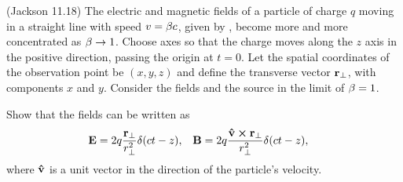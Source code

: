 \newcommand{\vr}{\vb{r}}
\newcommand{\vrperp}{\vr_\perp}

\begin{statement}{(Jackson 11.18)}
	The electric and magnetic fields of a particle of charge $q$ moving in a straight line with speed $v = \beta c$, given by , become more and more concentrated as $\beta \to 1$.  Choose axes so that the charge moves along the $z$ axis in the positive direction, passing the origin at $t = 0$.  Let the spatial coordinates of the observation point be $(x, y, z)$ and define the transverse vector $\vrperp$, with components $x$ and $y$.  Consider the fields and the source in the limit of $\beta = 1$.
\end{statement}

\newcommand{\rperp}{r_\perp}
\newcommand{\vE}{\vb{E}}
\newcommand{\vB}{\vb{B}}
\newcommand{\vh}{\vb{\hat{v}}}
\newcommand{\delctz}{\del(ct - z)}

\begin{problem} \label{3.a}
	Show that the fields can be written as
	\begin{align} \label{show3.a}
		\vE &= 2q \frac{\vrperp}{\rperp^2} \delctz, &
		\vB &= 2q \frac{\vh \cross \vrperp}{\rperp^2} \delctz,
	\end{align}
	where $\vh$ is a unit vector in the direction of the particle's velocity.
\end{problem}


\newcommand{\xh}{\vb{\hat{x}}}
\newcommand{\yh}{\vb{\hat{y}}}
\newcommand{\zh}{\vb{\hat{z}}}
\newcommand{\intii}{\int_{-\infty}^\infty}
\newcommand{\limgam}{\lim_{\gam \to \infty}}
\newcommand{\du}{\dd{u}}
\newcommand{\dz}{\dd{z}}
\newcommand{\vEperp}{\vE_\perp}

